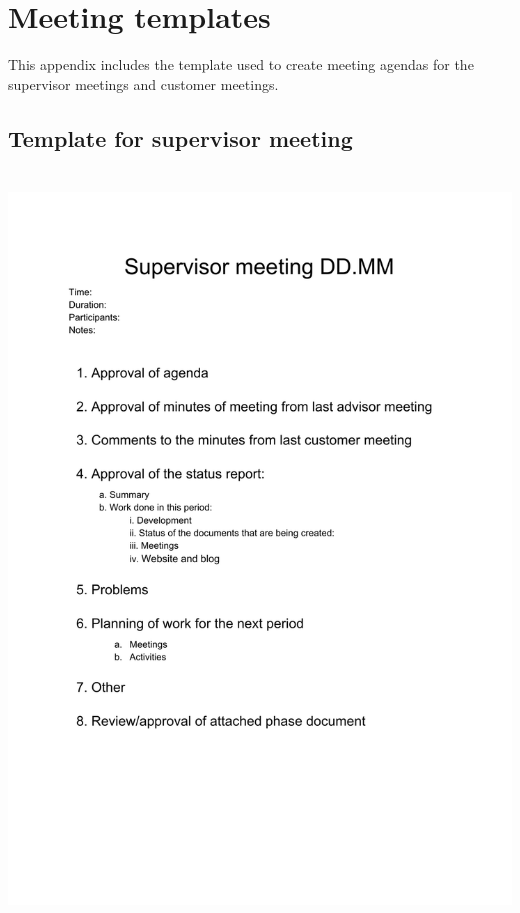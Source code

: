 \chapter{Meeting templates}
\label{app:templates}
This appendix includes the template used to create meeting agendas for the supervisor meetings and customer meetings.
\newpage
\section{Template for supervisor meeting}
\label{app:supervisor-template}

\includegraphics[trim={0 8cm 2cm 0},clip,height=20cm]{appendices/meeting-template-supervisor.pdf}



\newpage
